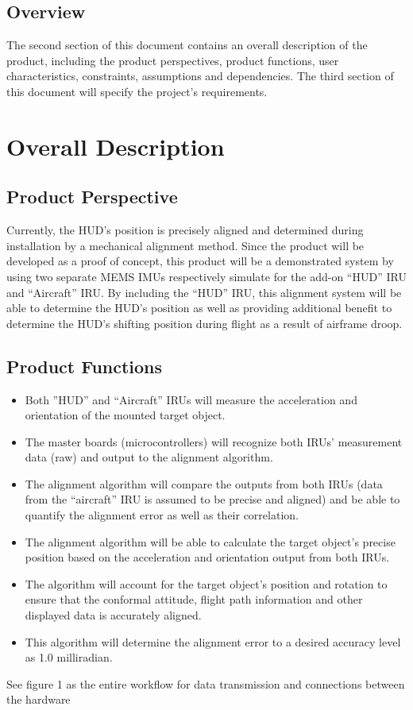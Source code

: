 \subsection{Overview}
The second section of this document contains an overall description of the product, including the product perspectives, product functions, user characteristics, constraints, assumptions and dependencies. The third section of this document will specify the project’s requirements. 




\newpage
\section{Overall Description}
\subsection{Product Perspective}
Currently, the HUD’s position is precisely aligned and determined during installation by a mechanical alignment method. Since the product will be developed as a proof of concept, this product will be a demonstrated system by using two separate MEMS IMUs respectively simulate for the add-on “HUD” IRU and “Aircraft” IRU. By including the “HUD” IRU, this alignment system will be able to determine the HUD’s position as well as providing additional benefit to determine the HUD’s shifting position during flight as a result of airframe droop.


\subsection{Product Functions}
\begin{itemize}
	\item 
	Both ”HUD” and “Aircraft” IRUs will measure the acceleration and orientation of the mounted target object.
	\item 
	The master boards (microcontrollers) will recognize both IRUs’ measurement data (raw) and output to the alignment algorithm.
	\item 
	The alignment algorithm will compare the outputs from both IRUs (data from the “aircraft” IRU is assumed to be precise and aligned) and be able to quantify the alignment error as well as their correlation.
	\item 
	The alignment algorithm will be able to calculate the target object’s precise position based on the acceleration and orientation output from both IRUs.
	\item 
	The algorithm will account for the target object’s position and rotation to ensure that the conformal attitude, flight path information and other displayed data is accurately aligned.
	\item 
	This algorithm will determine the alignment error to a desired accuracy level as 1.0 milliradian.
	\\
\end{itemize}
See figure 1 as the entire workflow for data transmission and connections between the hardware

